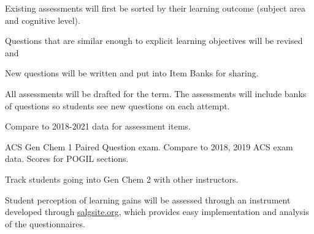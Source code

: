 \documentclass[10pt,letterpaper]{article}
\begin{document}

%
%

 Existing assessments will first be sorted by their learning outcome (subject area and cognitive level). 

 Questions that are similar enough to explicit learning objectives will be revised and 

 New questions will be written and put into Item Banks for sharing.

All assessments will be drafted for the term. The assessments will include banks of questions so students see new questions on each attempt. 


\subaim{}



%
%


 Compare to 2018-2021 data for assessment items.

 ACS Gen Chem 1 Paired Question exam.  Compare to 2018, 2019 ACS exam data. Scores for POGIL sections.

 Track students going into Gen Chem 2 with other instructors. 

Student perception of learning gains will be assessed through an instrument developed through \url{salgsite.org}, which provides easy implementation and analysis of the questionnaires. 
\end{document}
